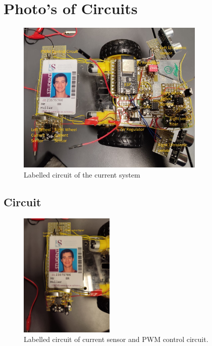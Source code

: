 \clearpage
\section{Photo's of Circuits}
\begin{figure}[H]
\centering
\includegraphics[width = 0.8\textwidth]{./Figures/FullCircuit_2.jpeg}
\caption{Labelled circuit of the current system}
\label{fig:full_prac_cir}
\end{figure}

\subsection{Circuit}
\begin{figure}[H]
\centering
\includegraphics[width = 0.4\textwidth]{./Figures/Cursens_Cir_Left_Card.jpeg}
\caption{Labelled circuit of current sensor and PWM control circuit.}
\label{fig:cursen_cir_card}
\end{figure}
